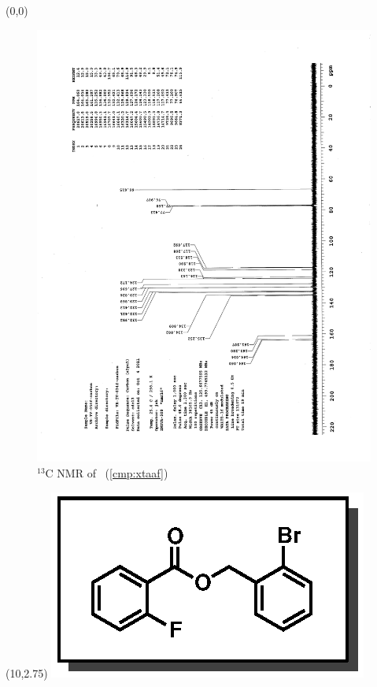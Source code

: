 \clearpage
\begin{textblock}{20}(0,0)
\begin{figure}[htb]
\caption{$^{13}$C NMR of  \CMPxtaaf\ (\ref{cmp:xtaaf})}
\includegraphics[scale=0.75, trim = 0mm 0mm 0mm 5mm,
clip]{chp_asymmetric/images/nmr/xtaafC}
\vspace{-100pt}
\end{figure}
\end{textblock}
\begin{textblock}{1}(10,2.75)
\includegraphics[scale=0.8, angle=90]{chp_asymmetric/images/xtaaf}
\end{textblock}
